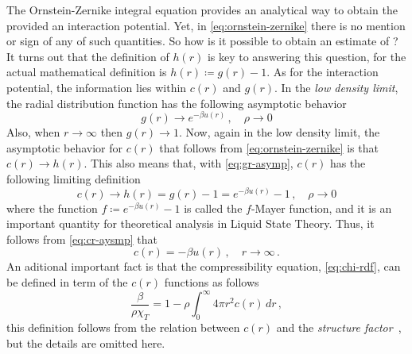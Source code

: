 The Ornstein-Zernike integral equation provides an analytical way to obtain the \rdf 
provided an interaction potential. Yet, in \autoref{eq:ornstein-zernike} there is no 
mention or sign of any of such quantities. So how is it possible to obtain an estimate
of \rdf? It turns out that the definition of $h(r)$ is key to answering this question,
for the actual mathematical definition is $h(r) \coloneqq g(r) - 1$.
As for the interaction potential, the information lies within $c(r)$ and $g(r)$.
In the \emph{low density limit}, the radial distribution function has the following
asymptotic behavior
\begin{equation}
    g(r) \to e^{- \beta u(r)} \, , \quad \rho \to 0
    \label{eq:gr-asymp}
\end{equation}
Also, when $r \to \infty$ then $g(r) \to 1$. 
Now, again in the low density limit, the asymptotic behavior
for $c(r)$ that follows from \autoref{eq:ornstein-zernike} is that $c(r) \to h(r)$.
This also means that, with \autoref{eq:gr-asymp}, $c(r)$ has the following
limiting definition
\begin{equation}
    c(r) \to h(r) = g(r) - 1 = e^{- \beta u(r)} - 1 \, , \quad \rho \to 0
    \label{eq:cr-aysmp}
\end{equation}
where the function $f \coloneqq e^{- \beta u(r)} - 1$ is called the $f$-Mayer
function, and it is an important quantity for theoretical analysis in Liquid State
Theory. Thus, it follows from \autoref{eq:cr-aysmp} that
\begin{equation}
    c(r) = - \beta u(r) \, , \quad r \to \infty 
    \, .
    \label{eq:cr-r-asymp}
\end{equation}
An aditional important fact is that the compressibility equation, \autoref{eq:chi-rdf},
can be defined in term of the $c(r)$ functions as follows
\begin{equation}
    \frac{\beta}{\rho \chi_{T}} = 1 - \rho \int_{0}^{\infty} 4 \pi r^2 c(r) \, dr
    \, ,
    \label{eq:compressibility-cr}
\end{equation}
this definition follows from the relation between $c(r)$ and the
\emph{structure factor}~\cite{hansenTheorySimpleLiquids2013}, but the details are omitted 
here.

